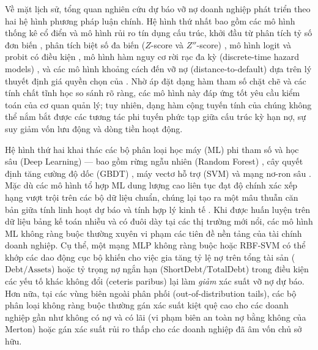 \documentclass[11pt,a4paper]{article}
\begin{document}
Về mặt lịch sử, tổng quan nghiên cứu dự báo vỡ nợ doanh nghiệp phát triển theo hai hệ hình phương pháp luận chính. Hệ hình thứ nhất bao gồm các mô hình thống kê cổ điển và mô hình rủi ro tín dụng cấu trúc, khởi đầu từ phân tích tỷ số đơn biến \citep{beaver1966financial}, phân tích biệt số đa biến ($Z$-score và $Z''$-score) \citep{altman1968financial,altman1995emerging,altman2017financial}, mô hình logit và probit có điều kiện \citep{ohlson1980financial,zmijewski1984methodological}, mô hình hàm nguy cơ rời rạc đa kỳ (discrete-time hazard models) \citep{shumway2001forecasting,chava2004bankruptcy,campbell2008search,bauer2014are}, và các mô hình khoảng cách đến vỡ nợ (distance-to-default) dựa trên lý thuyết định giá quyền chọn của \citet{merton1974pricing} \citep{hillegeist2004assessing,duffie2007multi,bharath2008forecasting}. Nhờ áp đặt dạng hàm tham số chặt chẽ và các tính chất tĩnh học so sánh rõ ràng, các mô hình này đáp ứng tốt yêu cầu kiểm toán của cơ quan quản lý; tuy nhiên, dạng hàm cộng tuyến tính của chúng không thể nắm bắt được các tương tác phi tuyến phức tạp giữa cấu trúc kỳ hạn nợ, sự suy giảm vốn lưu động và dòng tiền hoạt động.

Hệ hình thứ hai khai thác các bộ phân loại học máy (ML) phi tham số và học sâu (Deep Learning) --- bao gồm rừng ngẫu nhiên (Random Forest) \citep{breiman2001random}, cây quyết định tăng cường độ dốc (GBDT) \citep{chen2016xgboost,ke2017lightgbm,prokhorenkova2018catboost}, máy vectơ hỗ trợ (SVM) và mạng nơ-ron sâu \citep{lessmann2015benchmarking,zieba2016ensemble,barboza2017machine,mai2019deep,hosaka2019bankruptcy,gunnarsson2021deep}. Mặc dù các mô hình tổ hợp ML dung lượng cao liên tục đạt độ chính xác xếp hạng vượt trội trên các bộ dữ liệu chuẩn, chúng lại tạo ra một mâu thuẫn căn bản giữa tính linh hoạt dự báo và tính hợp lý kinh tế \citep{bussmann2021explainable,bucker2022transparency,dumitrescu2022machine}. Khi được huấn luyện trên dữ liệu bảng kế toán nhiễu và có đuôi dày tại các thị trường mới nổi, các mô hình ML không ràng buộc thường xuyên vi phạm các tiên đề nền tảng của tài chính doanh nghiệp. Cụ thể, một mạng MLP không ràng buộc hoặc RBF-SVM có thể khớp các dao động cục bộ khiến cho việc gia tăng tỷ lệ nợ trên tổng tài sản ($\text{Debt}/\text{Assets}$) hoặc tỷ trọng nợ ngắn hạn ($\text{ShortDebt}/\text{TotalDebt}$) trong điều kiện các yếu tố khác không đổi (ceteris paribus) lại làm \textit{giảm} xác suất vỡ nợ dự báo. Hơn nữa, tại các vùng biên ngoài phân phối (out-of-distribution tails), các bộ phân loại không ràng buộc thường gán xác suất kiệt quệ cao cho các doanh nghiệp gần như không có nợ và có lãi (vi phạm biên an toàn nợ bằng không của Merton) hoặc gán xác suất rủi ro thấp cho các doanh nghiệp đã âm vốn chủ sở hữu.
\end{document}
